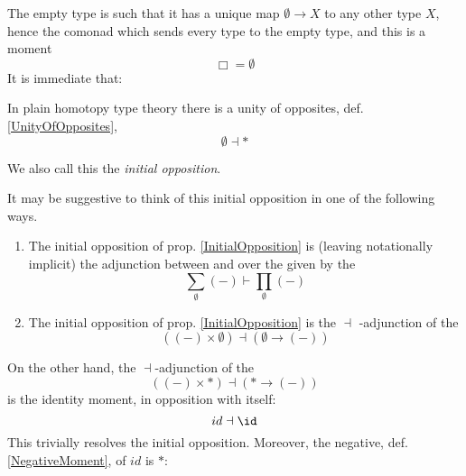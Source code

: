 The empty type is such that it has a unique map $\emptyset \to X$ to any other type $X$, hence the comonad which sends every type to the empty type, and this is a moment
\begin{displaymath}
\Box = \emptyset
\end{displaymath}
It is immediate that:
\begin{defn}
\label{InitialOpposition}\hypertarget{InitialOpposition}{}
In plain homotopy type theory there is a unity of opposites, def. \ref{UnityOfOpposites},
\begin{displaymath}
\emptyset \dashv \ast
\end{displaymath}
\end{defn}
We also call this the \emph{initial opposition}.
\begin{remark}
\label{AspectsOfTheInitialOpposition}\hypertarget{AspectsOfTheInitialOpposition}{}
It may be suggestive to think of this initial opposition in one of the following ways.
\begin{enumerate}%
\item The initial opposition of prop. \ref{InitialOpposition} is (leaving  notationally implicit) the adjunction between  and  over the  given by the 
\begin{displaymath}
\underset{\emptyset}{\sum}(-)
\vdash
\underset{\emptyset}{\prod}(-)
\end{displaymath}
\item The initial opposition of prop. \ref{InitialOpposition} is the  $\dashv$ -adjunction of the 
\begin{displaymath}
\left(
(-) \times \emptyset
\right)
\dashv
\left(
\emptyset \to (-)
\right)
\end{displaymath}
\end{enumerate}
On the other hand, the $\dashv$-adjunction of the 
\begin{displaymath}
\left(
(-) \times \ast
\right)
\dashv
\left(
\ast \to (-)
\right)
\end{displaymath}
is the identity moment, in opposition with itself:
\begin{displaymath}
id \dashv \id
\end{displaymath}
This trivially resolves the initial opposition. Moreover, the negative, def. \ref{NegativeMoment}, of $id$ is $\ast$:

\end{remark}
